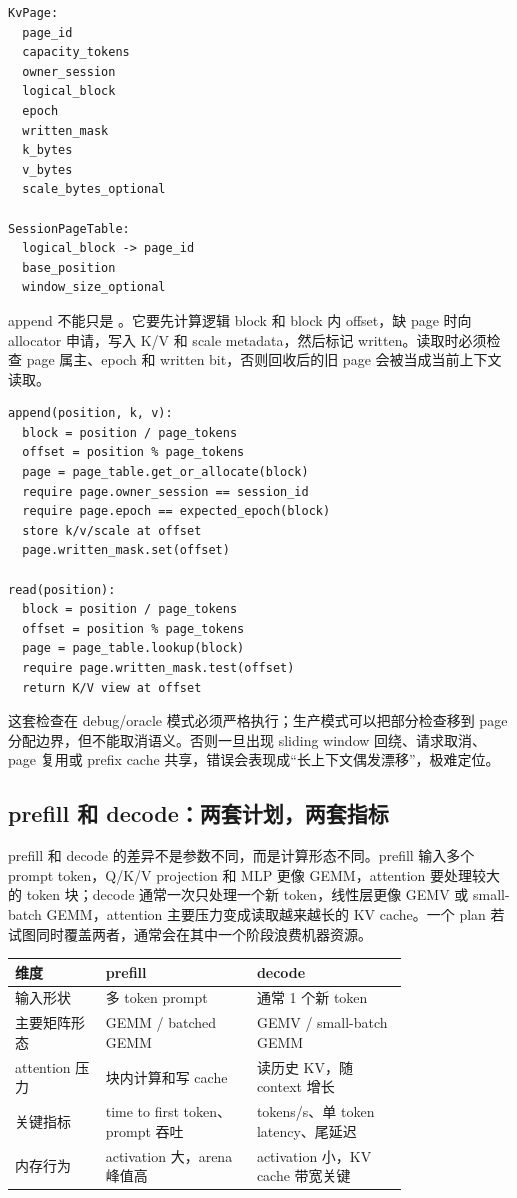 \begin{lstlisting}[numbers=none,caption={paged KV allocator 的状态}]
KvPage:
  page_id
  capacity_tokens
  owner_session
  logical_block
  epoch
  written_mask
  k_bytes
  v_bytes
  scale_bytes_optional

SessionPageTable:
  logical_block -> page_id
  base_position
  window_size_optional
\end{lstlisting}

append 不能只是 。它要先计算逻辑 block 和 block 内 offset，缺 page 时向 allocator 申请，写入 K/V 和 scale metadata，然后标记 written。读取时必须检查 page 属主、epoch 和 written bit，否则回收后的旧 page 会被当成当前上下文读取。

\begin{lstlisting}[numbers=none,caption={paged KV append/read 的核心检查}]
append(position, k, v):
  block = position / page_tokens
  offset = position % page_tokens
  page = page_table.get_or_allocate(block)
  require page.owner_session == session_id
  require page.epoch == expected_epoch(block)
  store k/v/scale at offset
  page.written_mask.set(offset)

read(position):
  block = position / page_tokens
  offset = position % page_tokens
  page = page_table.lookup(block)
  require page.written_mask.test(offset)
  return K/V view at offset
\end{lstlisting}

这套检查在 debug/oracle 模式必须严格执行；生产模式可以把部分检查移到 page 分配边界，但不能取消语义。否则一旦出现 sliding window 回绕、请求取消、page 复用或 prefix cache 共享，错误会表现成“长上下文偶发漂移”，极难定位。

\subsection{prefill 和 decode：两套计划，两套指标}

prefill 和 decode 的差异不是参数不同，而是计算形态不同。prefill 输入多个 prompt token，Q/K/V projection 和 MLP 更像 GEMM，attention 要处理较大的 token 块；decode 通常一次只处理一个新 token，线性层更像 GEMV 或 small-batch GEMM，attention 主要压力变成读取越来越长的 KV cache。一个 plan 若试图同时覆盖两者，通常会在其中一个阶段浪费机器资源。

\begin{center}
\begin{tabular}{p{0.18\linewidth}p{0.30\linewidth}p{0.30\linewidth}}
\toprule
维度 & prefill & decode \\
\midrule
输入形状 & 多 token prompt & 通常 1 个新 token \\
主要矩阵形态 & GEMM / batched GEMM & GEMV / small-batch GEMM \\
attention 压力 & 块内计算和写 cache & 读历史 KV，随 context 增长 \\
关键指标 & time to first token、prompt 吞吐 & tokens/s、单 token latency、尾延迟 \\
内存行为 & activation 大，arena 峰值高 & activation 小，KV cache 带宽关键 \\
\bottomrule
\end{tabular}
\end{center}

